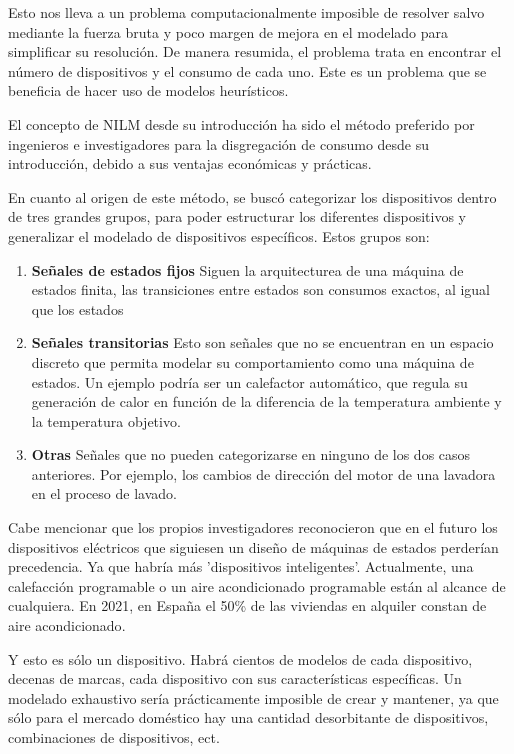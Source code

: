 Esto nos lleva a un problema computacionalmente imposible de resolver salvo mediante la fuerza bruta\autocite[4]{192069} y poco margen de mejora en el modelado para simplificar su resolución. De manera resumida, el problema trata en encontrar el número de dispositivos y el consumo de cada uno. 
Este es un problema que se beneficia de hacer uso de modelos heurísticos.

El concepto de NILM desde su introducción ha sido el método preferido por ingenieros e investigadores para la disgregación de consumo desde su introducción, debido a sus ventajas económicas y prácticas.\autocite[pág. 2, pár. 4]{Nalmpantis2019}

En cuanto al origen de este método, se buscó categorizar los dispositivos dentro de tres grandes grupos, para poder estructurar los diferentes dispositivos y generalizar el modelado de dispositivos específicos. 
Estos grupos son: 

\begin{enumerate}
\item \textbf{Señales de estados fijos} Siguen la arquitecturea de una máquina de estados finita, las transiciones entre estados son consumos exactos, al igual que los estados
\item \textbf{Señales transitorias} Esto son señales que no se encuentran en un espacio discreto que permita modelar su comportamiento como una máquina de estados. Un ejemplo podría ser un calefactor automático, que regula su generación de calor en función de la diferencia de la temperatura ambiente y la temperatura objetivo.
\item \textbf{Otras} Señales que no pueden categorizarse en ninguno de los dos casos anteriores. Por ejemplo, los cambios de dirección del motor de una lavadora en el proceso de lavado. 
\end{enumerate}

Cabe mencionar que los propios investigadores reconocieron que en el futuro los dispositivos eléctricos que siguiesen un diseño de máquinas de estados perderían precedencia. Ya que habría más 'dispositivos inteligentes'. Actualmente, una calefacción programable o un aire acondicionado programable están al alcance de cualquiera.
En 2021, en España el 50\% de las viviendas en alquiler constan de aire acondicionado\autocite{idealista2021}. 

Y esto es sólo un dispositivo. Habrá cientos de modelos de cada dispositivo, decenas de marcas, cada dispositivo con sus características específicas. 
Un modelado exhaustivo sería prácticamente imposible de crear y mantener, ya que sólo para el mercado doméstico hay una cantidad desorbitante de dispositivos, combinaciones de dispositivos, ect.

